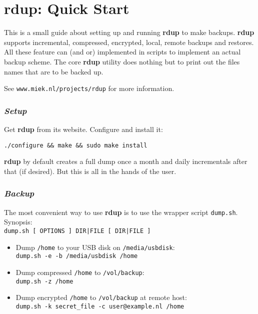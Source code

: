 \documentclass[a4paper, openany]{blocksbook}
\newcommand{\rdup}{\textbf{rdup}}
\newcommand{\cmd}[1]{\texttt{#1}}
\newcommand{\url}[1]{\texttt{#1}}
\newcommand{\path}[1]{\texttt{#1}}
\begin{document}
\chapter*{\rdup: Quick Start}
This is a small guide about setting up and running \rdup{} to make
backups. \rdup{}
supports incremental, compressed, encrypted, local, remote  backups and
restores. All these feature can (and or) implemented in scripts to
implement an actual backup scheme. The core \rdup{} utility does
nothing but to print out the files names that are to be backed up.

See \url{www.miek.nl/projects/rdup} for more information.

\subsection*{\textit{Setup}}
Get \rdup{} from its website. Configure and install it:
\begin{verbatim}
./configure && make && sudo make install
\end{verbatim}
\rdup{} by default creates a full dump once a month and 
daily incrementals after that (if desired). But this is
all in the hands of the user.

\subsection*{\textit{Backup}}
The most convenient way to use \rdup{} is to use the wrapper
script \cmd{dump.sh}. Synopsis:\\
\cmd{dump.sh [ OPTIONS ] DIR|FILE [ DIR|FILE ]}
\begin{itemize}
\item
Dump \path{/home} to your USB disk on \path{/media/usbdisk}:\\
\cmd{dump.sh -e -b /media/usbdisk /home}
\item
Dump compressed \path{/home} to \path{/vol/backup}:\\
\cmd{dump.sh -z /home} 
\item
Dump encrypted \path{/home} to \path{/vol/backup} at remote
host:\\
\cmd{dump.sh -k secret\_file -c user@example.nl /home}
\end{itemize}
\end{document}
